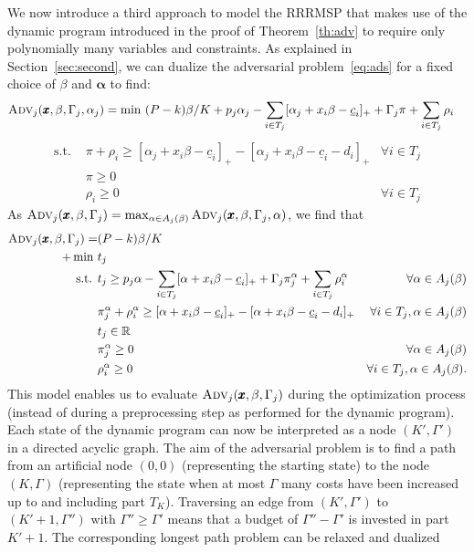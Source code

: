 We now introduce a third approach to model the RRRMSP that makes use of the dynamic program introduced in the proof of Theorem~\ref{th:adv} to require only polynomially many variables and constraints.
As explained in Section~\ref{sec:second}, we can dualize the adversarial problem~\eqref{eq:ads} for a fixed choice of $\beta$ and $\pmb{\alpha}$ to find:
\begin{align*}
\textsc{Adv}_j(\pmb{x},\beta,\Gamma_j,\alpha_j) &= \min\ (P-k)\beta\lasse{/K} + p_j\alpha_j - \sum_{i\in T_j} [\alpha_j + x_i\beta - \underline{c}_i]_+ + \Gamma_j \pi + \sum_{i\in T_j} \rho_i
\end{align*}
\begin{align*}
\text{s.t. } & \pi + \rho_i \ge [\alpha_j + x_i\beta - \underline{c}_i]_+ - [\alpha_j + x_i \beta - \underline{c}_i - d_i]_+ & \forall i\in T_j \\
& \pi \ge 0 \\
& \rho_i \ge 0 & \forall i\in T_j
\end{align*}
As $\textsc{Adv}_j(\pmb{x},\beta,\Gamma_j) = \max_{\alpha\in A_j(\beta)} \textsc{Adv}_j(\pmb{x},\beta,\Gamma_j,\alpha)$, we find that
\begin{align*}
\textsc{Adv}_j(\pmb{x},\beta,\Gamma_j) = &(P-k)\beta{/K} \\
+ \min\ & t_j \\
\text{s.t. } & t_j \ge p_j \alpha - \sum_{i\in T_j} [\alpha + x_i\beta - \underline{c}_i]_+ + \Gamma_j \pi_j^\alpha + \sum_{i\in T_j} \rho_i^\alpha & \forall \alpha \in A_j(\beta) \\
& \pi_j^\alpha + \rho_i^\alpha \ge [\alpha + x_i\beta - \underline{c}_i]_+ - [\alpha + x_i \beta - \underline{c}_i - d_i]_+ & \forall i\in T_j, \alpha\in A_j(\beta)\\
& t_j \in \mathbb{R} \\
& \pi_j^\alpha \ge 0 & \forall \alpha\in A_j(\beta) \\
& \rho_i^\alpha \ge 0 & \forall i\in T_j , \alpha\in A_j(\beta).
\end{align*}
This model enables us to evaluate $\textsc{Adv}_j(\pmb{x},\beta,\Gamma_j)$ during the optimization process (instead of during a preprocessing step as performed for the dynamic program). Each state of the dynamic program can now be interpreted as a node $(K',\Gamma')$ in a directed acyclic graph. The aim of the adversarial problem is to find a path from an artificial node $(0,0)$ (representing the starting state) to the node $(K,\Gamma)$ (representing the state when at most $\Gamma$ many costs have been increased up to and including part $T_K$). Traversing an edge from $(K',\Gamma')$ to $(K'+1,\Gamma'')$ with $\Gamma''\ge \Gamma'$ means that a budget of $\Gamma''-\Gamma'$ is invested in part $K'+1$. The corresponding longest path problem can be relaxed and dualized 
